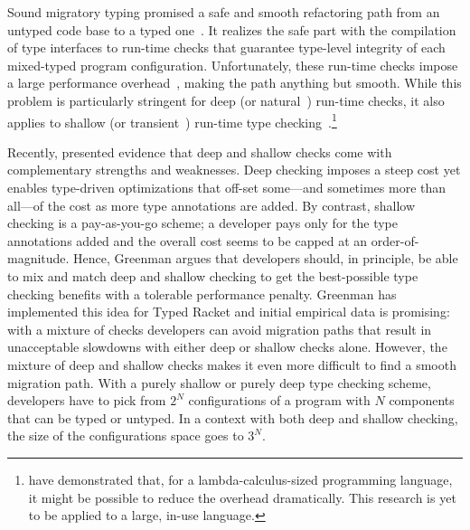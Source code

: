 
Sound migratory typing promised a safe and smooth refactoring path from an
untyped code base to a typed one~\cite{tf-dls-2006, tfffgksst-snapl-2017}. It
realizes the safe part with the compilation of type interfaces to run-time
checks that guarantee type-level integrity of each mixed-typed program configuration.
Unfortunately, these run-time checks impose a large performance
overhead~\cite{gtnffvf-jfp-2019}, making the path anything but smooth. While
this problem is particularly stringent for deep (or natural~\cite{tf-dls-2006,
tf-popl-2008, st-sfp-2006}) run-time checks, it also applies to shallow (or
transient~\cite{vss-popl-2017,vksb-dls-2014,v-thesis-2019}) run-time type
checking~\cite{gm-pepm-2018}.\footnote{\citet{kas-pldi-2019} have demonstrated
that, for a lambda-calculus-sized programming language, it might be possible to
reduce the overhead dramatically. This research is yet to be applied to a large,
in-use language.}

Recently, \citet{g-thesis-2020,g-deep-shallow} presented evidence that deep and
shallow checks come with complementary strengths and weaknesses. Deep checking
imposes a steep cost yet enables type-driven optimizations that off-set
some---and sometimes more than all---of the cost as more type annotations are
added. By contrast, shallow checking is a pay-as-you-go scheme; a developer pays
only for the type annotations added and the overall cost seems to be capped at
an order-of-magnitude. Hence, Greenman argues that developers should, in
principle, be able to mix and match deep and shallow checking to get the
best-possible type checking benefits with a tolerable performance penalty.
Greenman has implemented this idea for Typed Racket and initial empirical data
is promising: with a mixture of checks developers can avoid migration paths that
result in unacceptable slowdowns with either deep or shallow checks alone.
However, the mixture of deep and shallow checks makes it even more difficult to
find a smooth migration path. With a purely shallow or purely deep type checking scheme,
developers have to pick from $2^N$ configurations of a program with $N$
components that can be typed or untyped. In a context with both deep and shallow
checking, the size of the configurations space goes to $3^N$.

